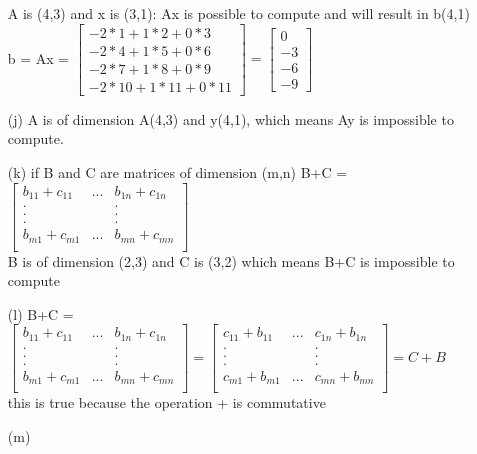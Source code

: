 \documentclass[a4paper]{article}
\begin{document}
\begin{itemize}
A is (4,3) and x is (3,1): Ax is possible to compute and will result in b(4,1)\\
b = Ax = 
$
\begin{bmatrix} 
-2*1+1*2+0*3\\
-2*4+1*5+0*6\\
-2*7+1*8+0*9\\
-2*10+1*11+0*11 
\end{bmatrix}
=
\begin{bmatrix} 
0\\
-3\\
-6\\
-9
\end{bmatrix}
$
\item[(j)] A is of dimension A(4,3) and y(4,1), which means Ay is impossible to compute.
\item[(k)]if B and C are matrices of dimension (m,n) B+C =
$
\begin{bmatrix} 
b_{11}+c_{11} & ... & b_{1n}+c_{1n}\\
.&&.\\
.&&.\\
.&&.\\
b_{m1}+c_{m1} & ... & b_{mn}+c_{mn}\\
\end{bmatrix}
$\\
B is of dimension (2,3) and C is (3,2) which means B+C is impossible to compute
\item[(l)] B+C =
$
\begin{bmatrix} 
b_{11}+c_{11} & ... & b_{1n}+c_{1n}\\
.&&.\\
.&&.\\
.&&.\\
b_{m1}+c_{m1} & ... & b_{mn}+c_{mn}\\
\end{bmatrix}
=
\begin{bmatrix} 
c_{11}+b_{11} & ... & c_{1n}+b_{1n}\\
.&&.\\
.&&.\\
.&&.\\
c_{m1}+b_{m1} & ... & c_{mn}+b_{mn}\\

\end{bmatrix}
=
C+B
$\\
this is true because the operation + is commutative
\item[(m)]  


\end{itemize}
\end{document}
